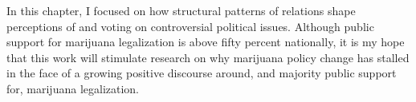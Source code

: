 In this chapter, I focused on how structural patterns of relations shape perceptions of and voting on controversial political issues. Although public  support for marijuana legalization is above fifty percent nationally, it is my hope that this work will stimulate research on why marijuana policy change has stalled in the face of a growing positive discourse around, and majority public support for, marijuana legalization.



%
%



\begin{singlespace}
{\renewcommand\normalsize{\tiny}%
\normalsize
{}}
\end{singlespace}

